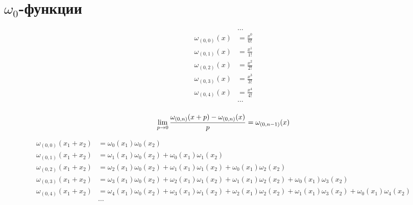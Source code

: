 
\section{$\omega_0$-функции}

\begin{equation*}\begin{aligned}
&\ldots \\
\omega_{(0,0)}(x) &= \frac{x^0}{0!} \\
\omega_{(0,1)}(x) &= \frac{x^1}{1!} \\
\omega_{(0,2)}(x) &= \frac{x^2}{2!} \\
\omega_{(0,3)}(x) &= \frac{x^3}{3!} \\
\omega_{(0,4)}(x) &= \frac{x^4}{4!} \\
&\ldots \\
\end{aligned}\end{equation*}

\begin{equation*}
\lim_{p \to 0} \frac{\omega_{(0, n)}(x + p) - \omega_{(0, n)}(x)}{p} = \omega_{(0, n - 1)}(x) \\
\end{equation*}

\begin{equation*} \begin{aligned}
\omega_{(0,0)}(x_1 + x_2) &=  
  \omega_0(x_1) \omega_0(x_2) \\
%
\omega_{(0,1)}(x_1 + x_2) &=  
  \omega_1(x_1) \omega_0(x_2)
+ \omega_0(x_1) \omega_1(x_2) \\
%
\omega_{(0,2)}(x_1 + x_2) &=  
  \omega_2(x_1) \omega_0(x_2)
+ \omega_1(x_1) \omega_1(x_2)
+ \omega_0(x_1) \omega_2(x_2) \\
%
\omega_{(0,3)}(x_1 + x_2) &=  
  \omega_3(x_1) \omega_0(x_2)
+ \omega_2(x_1) \omega_1(x_2)
+ \omega_1(x_1) \omega_2(x_2)
+ \omega_0(x_1) \omega_3(x_2) \\
%
\omega_{(0,4)}(x_1 + x_2) &=  
  \omega_4(x_1) \omega_0(x_2)
+ \omega_3(x_1) \omega_1(x_2)
+ \omega_2(x_1) \omega_2(x_2)
+ \omega_1(x_1) \omega_3(x_2)
+ \omega_0(x_1) \omega_4(x_2) \\
%
&\ldots \\
\end{aligned} \end{equation*}

